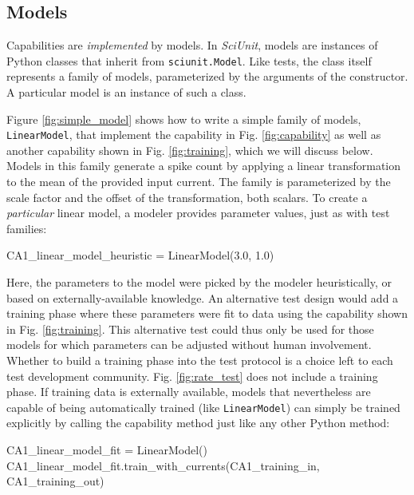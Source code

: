 \documentclass{frontiersSCNS}
\let\verbx\lstinline
\begin{document}
\subsection{Models}
Capabilities are \emph{implemented} by models. In \textit{SciUnit}, models are instances of Python classes that inherit from \verbx{sciunit.Model}. Like tests, the class itself represents a family of models, parameterized by the arguments of the constructor. A particular model is an instance of such a class.

Figure \ref{fig:simple_model} shows how to write a simple {family} of models, \verbx{LinearModel}, that implement the capability in Fig. \ref{fig:capability} as well as another capability shown in Fig. \ref{fig:training}, which we will discuss below. 
Models in this family generate a spike count by applying a linear transformation to the mean of the provided input current. The family is parameterized by the scale factor and the offset of the transformation, both scalars. 
To create a \emph{particular} linear model, a modeler provides parameter values, just as with test families:
\begin{python}
CA1_linear_model_heuristic = LinearModel(3.0, 1.0)
\end{python}
Here, the parameters to the model were picked by the modeler heuristically, or based on externally-available knowledge. 
An alternative test design would add a training phase where these parameters were fit to data using the capability shown in Fig. \ref{fig:training}. 
This alternative test could thus only be used for those models for which parameters can be adjusted without human involvement. 
Whether to build a training phase into the test protocol is a choice left to each test development community. 
Fig. \ref{fig:rate_test} does not include a training phase. 
If training data is externally available, models that nevertheless are capable of being automatically trained (like \verb|LinearModel|) can simply be trained explicitly by calling the capability method just like any other Python method:
\begin{python}
CA1_linear_model_fit = LinearModel()
CA1_linear_model_fit.train_with_currents(CA1_training_in, CA1_training_out)
\end{python}
\end{document}
